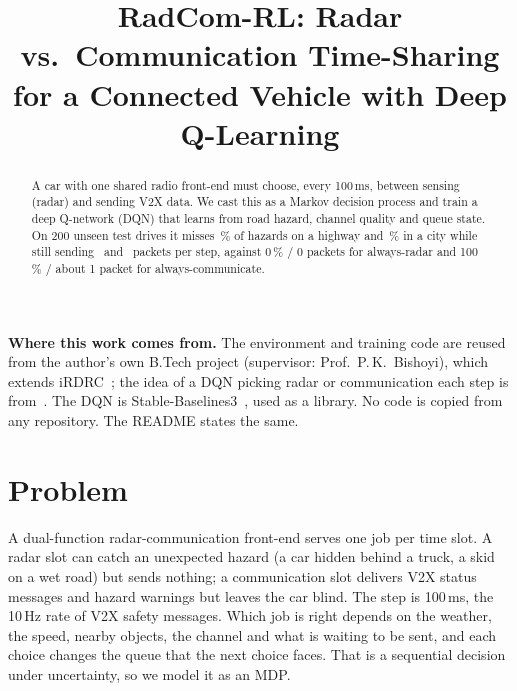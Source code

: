 \documentclass[10pt,conference]{IEEEtran}
\begin{document}
\title{RadCom-RL: Radar vs.\ Communication Time-Sharing for a Connected Vehicle with Deep Q-Learning}

\author{
}

\maketitle

\begin{abstract}
A car with one shared radio front-end must choose, every 100\,ms, between sensing
(radar) and sending V2X data. We cast this as a Markov decision process and train a
deep Q-network (DQN) that learns from road hazard, channel quality and queue state.
On 200 unseen test drives it misses \hwmiss\,\% of hazards on a highway and
\citymiss\,\% in a city while still sending \hwtput\ and \citytput\ packets per
step, against 0\,\% / 0 packets for always-radar and 100\,\% / about 1 packet
for always-communicate.
\end{abstract}

\noindent\textbf{Where this work comes from.} The environment and training code
are reused from the author's own B.Tech project (supervisor: Prof.\ P.\,K.\ Bishoyi),
which extends iRDRC~\cite{hieu2020irdrc}; the idea of a DQN picking radar or
communication each step is from~\cite{hieu2020irdrc}. The DQN is
Stable-Baselines3~\cite{raffin2021sb3}, used as a library. No code is copied
from any repository. The README states the same.

\section{Problem}
A dual-function radar-communication front-end serves one job per time slot. A
radar slot can catch an unexpected hazard (a car hidden behind a truck, a
skid on a wet road) but sends nothing; a communication slot delivers V2X status
messages and hazard warnings but leaves the car blind. The step is 100\,ms, the
10\,Hz rate of V2X safety messages. Which job is right depends on the weather,
the speed, nearby objects, the channel and what is waiting to be sent, and each
choice changes the queue that the next choice faces. That is a sequential
decision under uncertainty, so we model it as an MDP.
\end{document}
